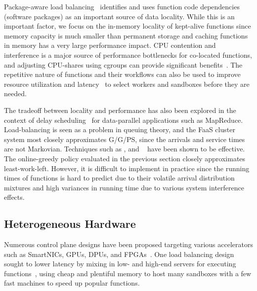 Package-aware load balancing~\cite{package-cristina-19} identifies and uses function code dependencies (software packages) as an important source of data locality.
While this is an important factor, we focus on the in-memory locality of kept-alive functions since memory capacity is much smaller than permanent storage and caching functions in memory has a very large performance impact.
CPU contention and interference is a major source of performance bottlenecks for co-located functions, and adjusting CPU-shares using cgroups can provide significant benefits~\cite{suresh2019fnsched, suresh2021servermore, ensure-faas-acsos20}.
The repetitive nature of functions and their workflows can also be used to improve resource utilization and latency~\cite{hunhoff2020proactive, yu2021faasrank, puru_xanadu_20, przybylski2021data} to select workers and sandboxes before they are needed. %


The tradeoff between locality and performance has also been explored in the context of delay scheduling~\cite{zaharia2010delay} for data-parallel applications such as MapReduce.
Load-balancing is seen as a  problem in queuing theory, and the FaaS cluster system most closely approximates G/G/PS, since the arrivals and service times are not Markovian.
Techniques such as , and ~\cite{gupta2007analysis} have been shown to be effective.
The online-greedy policy evaluated in the previous section closely approximates least-work-left.
However, it is difficult to implement in practice since the running times of functions is hard to predict due to their volatile arrival distribution mixtures and high variances in running time due to various system interference effects.


\subsection{Heterogeneous Hardware}

Numerous control plane designs have been proposed targeting various accelerators such as SmartNICs, GPUs, DPUs, and FPGAs~\cite{choi2020lambda,du2022serverless,pemberton2022kernel,daw2021speedo}.
One load balancing design sought to lower latency by mixing in low- and high-end servers for executing functions~\cite{roy2022icebreaker}, using cheap and plentiful memory to host many sandboxes with a few fast machines to speed up popular functions.

